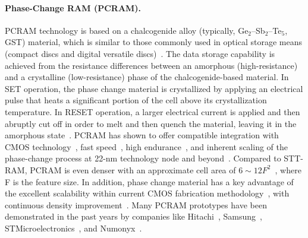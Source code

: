 \paragraph{Phase-Change RAM (PCRAM).}
PCRAM technology is based on a chalcogenide alloy (typically, Ge$_2$--Sb$_2$--Te$_5$,
GST) material, which is similar to those commonly used in optical storage means
(compact discs and digital versatile discs)~\cite{Bedeschi09}.
The data storage capability is achieved from the resistance differences between an
amorphous (high-resistance) and a crystalline (low-resistance) phase of
the chalcogenide-based material. In
SET operation, the phase change material is crystallized by
applying an electrical pulse that heats a significant portion of
the cell above its crystallization temperature. In RESET
operation, a larger electrical current is applied and then
abruptly cut off in order to melt and then quench the material, leaving it
in the amorphous state~\cite{burr:scm08}. PCRAM has shown to offer
compatible integration with CMOS technology~\cite{Oh06}, fast speed~\cite{Pirovano03},
high endurance~\cite{Lai03}, and inherent scaling of the phase-change process at 22-nm technology
node and beyond~\cite{Chen06}. Compared to STT-RAM, PCRAM is even denser with an approximate cell area of $6\sim12F^2$~\cite{ITRS07}, where F is the feature size. In addition, phase change material has a key advantage of the excellent scalability within current CMOS fabrication methodology~\cite{Cho05,Kim06,Lai01,Pirovano03,Raoux08}, with continuous density improvement~\cite{Nirshl07,Chen07-iedm,Im08}. Many PCRAM prototypes have been demonstrated in the past years by companies like Hitachi~\cite{Hanzawa07}, Samsung~\cite{Lee07-isscc}, STMicroelectronics~\cite{Bedeschi08, Sandre10}, and Numonyx~\cite{Villa10}.




